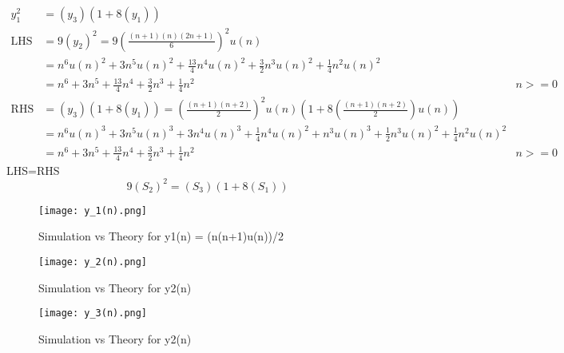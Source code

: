 \documentclass[journal,12pt,onecolumn]{IEEEtran}
\theoremstyle{remark}
\begin{document}
\begin{align}
y_1^2 &= (y_3)(1 + 8(y_1)) \\
\text{LHS} &= 9(y_2)^2 = 9\left(\frac{(n+1)(n)(2n+1)}{6}\right)^2u(n)\\
&=n^6 u(n)^2 + 3n^5 u(n)^2 + \frac{13}{4}n^4 u(n)^2 + \frac{3}{2}n^3 u(n)^2 + \frac{1}{4}n^2 u(n)^2\\
&= n^6 + 3n^5 + \frac{13}{4}n^4 + \frac{3}{2}n^3 + \frac{1}{4}n^2 &n>=0\\
\text{RHS} &= (y_3)(1 + 8(y_1)) = \left(\frac{(n+1)(n+2)}{2}\right)^2u(n)(1+8\left(\frac{(n+1)(n+2)}{2}\right)u(n)) \\
&=n^6 u(n)^3 + 3n^5 u(n)^3 + 3n^4 u(n)^3 + \frac{1}{4}n^4 u(n)^2 + n^3 u(n)^3 + \frac{1}{2}n^3 u(n)^2 + \frac{1}{4}n^2 u(n)^2\\
&= n^6 + 3n^5 + \frac{13}{4}n^4 + \frac{3}{2}n^3 + \frac{1}{4}n^2 &n>=0
\end{align}
LHS=RHS
\[ 9(S_2)^2 = (S_3)(1 + 8(S_1)) \]

\begin{figure}[htbp]
    \centering
    \texttt{[image: y\_1(n).png]}
    \caption{Simulation vs Theory for y1(n) = (n(n+1)u(n))/2}
    \label{fig:figure1}
\end{figure}  

\begin{figure}[htbp]
    \centering
    \texttt{[image: y\_2(n).png]}
    \caption{Simulation vs Theory for y2(n)}
    \label{fig:figure2}
\end{figure}   

\begin{figure}[htbp]
    \centering
    \texttt{[image: y\_3(n).png]}
    \caption{Simulation vs Theory for y2(n) }
    \label{fig:figure3}
\end{figure} 
\end{document}

